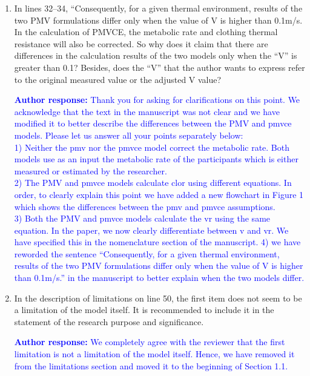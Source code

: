 \documentclass[a4paper, 10pt]{letter}
\newcommand{\response}[1]{\textcolor{blue}{\textbf{Author response:} #1}}
\begin{document}
\begin{letter}
\begin{enumerate}
            \item In lines 32--34, ``Consequently, for a given thermal environment, results of the two PMV formulations differ only when the value of V is higher than 0.1m/s.
            In the calculation of PMVCE, the metabolic rate and clothing thermal resistance will also be corrected.
            So why does it claim that there are differences in the calculation results of the two models only when the ``V'' is greater than 0.1?
            Besides, does the ``V'' that the author wants to express refer to the original measured value or the adjusted V value?

            \response{
                Thank you for asking for clarifications on this point.
                We acknowledge that the text in the manuscript was not clear and we have modified it to better describe the differences between the PMV and \ac{pmvce} models.
                Please let us answer all your points separately below:\\
                1) Neither the \ac{pmv} nor the \ac{pmvce} model correct the metabolic rate.
                Both models use as an input the metabolic rate of the participants which is either measured or estimated by the researcher.\\
                2) The PMV and \ac{pmvce} models calculate \ac{clor} using different equations.
                In order, to clearly explain this point we have added a new flowchart in Figure 1 which shows the differences between the \ac{pmv} and \ac{pmvce} assumptions.\\
                3) Both the PMV and \ac{pmvce} models calculate the \acf{vr} using the same equation.
                In the paper, we now clearly differentiate between \acf{v} and \acf{vr}.
                We have specified this in the nomenclature section of the manuscript.
                4) we have reworded the sentence ``Consequently, for a given thermal environment, results of the two PMV formulations differ only when the value of V is higher than 0.1m/s.'' in the manuscript to better explain when the two models differ.
            }

            \item In the description of limitations on line 50, the first item does not seem to be a limitation of the model itself.
            It is recommended to include it in the statement of the research purpose and significance.

            \response{
                We completely agree with the reviewer that the first limitation is not a limitation of the model itself.
                Hence, we have removed it from the limitations section and moved it to the beginning of Section 1.1.
            }


\end{enumerate}
\end{letter}
\end{document}
